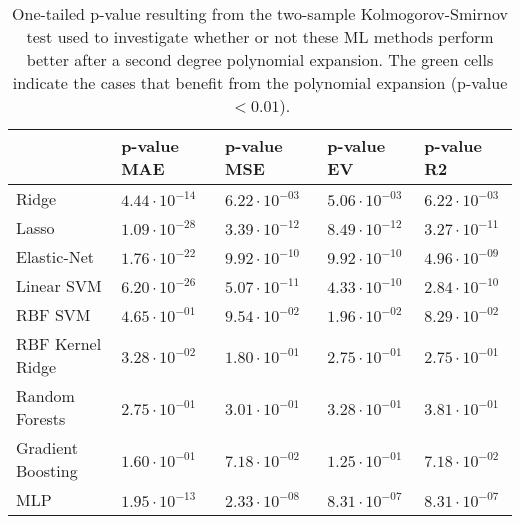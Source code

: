 
\begin{table}
\begin{tabular}{lllll}
\toprule
{} & p-value MAE & p-value MSE & p-value EV & p-value R2 \\
\midrule
Ridge              &    \cellcolor{green!25}$4.44\cdot 10^{-14}$ &    \cellcolor{green!25}$6.22\cdot 10^{-03}$ &   \cellcolor{green!25}$5.06\cdot 10^{-03}$ &   \cellcolor{green!25}$6.22\cdot 10^{-03}$ \\
Lasso              &    \cellcolor{green!25}$1.09\cdot 10^{-28}$ &    \cellcolor{green!25}$3.39\cdot 10^{-12}$ &   \cellcolor{green!25}$8.49\cdot 10^{-12}$ &   \cellcolor{green!25}$3.27\cdot 10^{-11}$ \\
Elastic-Net        &    \cellcolor{green!25}$1.76\cdot 10^{-22}$ &    \cellcolor{green!25}$9.92\cdot 10^{-10}$ &   \cellcolor{green!25}$9.92\cdot 10^{-10}$ &   \cellcolor{green!25}$4.96\cdot 10^{-09}$ \\
Linear SVM         &    \cellcolor{green!25}$6.20\cdot 10^{-26}$ &    \cellcolor{green!25}$5.07\cdot 10^{-11}$ &   \cellcolor{green!25}$4.33\cdot 10^{-10}$ &   \cellcolor{green!25}$2.84\cdot 10^{-10}$ \\
RBF SVM            &    \cellcolor{red!25}$4.65\cdot 10^{-01}$ &    \cellcolor{red!25}$9.54\cdot 10^{-02}$ &   \cellcolor{red!25}$1.96\cdot 10^{-02}$ &   \cellcolor{red!25}$8.29\cdot 10^{-02}$ \\
RBF Kernel Ridge   &    \cellcolor{red!25}$3.28\cdot 10^{-02}$ &    \cellcolor{red!25}$1.80\cdot 10^{-01}$ &   \cellcolor{red!25}$2.75\cdot 10^{-01}$ &   \cellcolor{red!25}$2.75\cdot 10^{-01}$ \\
Random Forests     &    \cellcolor{red!25}$2.75\cdot 10^{-01}$ &    \cellcolor{red!25}$3.01\cdot 10^{-01}$ &   \cellcolor{red!25}$3.28\cdot 10^{-01}$ &   \cellcolor{red!25}$3.81\cdot 10^{-01}$ \\
Gradient Boosting  &    \cellcolor{red!25}$1.60\cdot 10^{-01}$ &    \cellcolor{red!25}$7.18\cdot 10^{-02}$ &   \cellcolor{red!25}$1.25\cdot 10^{-01}$ &   \cellcolor{red!25}$7.18\cdot 10^{-02}$ \\
MLP                &    \cellcolor{green!25}$1.95\cdot 10^{-13}$ &    \cellcolor{green!25}$2.33\cdot 10^{-08}$ &   \cellcolor{green!25}$8.31\cdot 10^{-07}$ &   \cellcolor{green!25}$8.31\cdot 10^{-07}$ \\
\bottomrule
\end{tabular}
\caption{One-tailed p-value resulting from the two-sample Kolmogorov-Smirnov test used to investigate whether or not these ML methods perform better after a second degree polynomial expansion. The green cells indicate the cases that benefit from the polynomial expansion (p-value $< 0.01$).}
\end{table}






